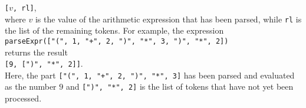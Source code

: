 \begin{enumerate}
      \hspace*{1.3cm}
      \texttt{[$v$, rl]},
      \\[0.2cm]
      where $v$ is the value of the arithmetic expression that has been parsed, while
      \texttt{rl} is the list of the remaining tokens.  For example, the expression
      \\[0.2cm]
      \hspace*{1.3cm}
      \verb|parseExpr(["(", 1, "+", 2, ")", "*", 3, ")", "*", 2])|
      \\[0.2cm]
      returns the result
      \\[0.2cm]
      \hspace*{1.3cm}
      \verb|[9, [")", "*", 2]]|.
      \\[0.2cm]
      Here, the part \verb|["(", 1, "+", 2, ")", "*", 3]| has been parsed and evaluated as
      the number $9$ and \verb|[")", "*", 2]| is the list of tokens that have not yet been
      processed.


\end{enumerate}
